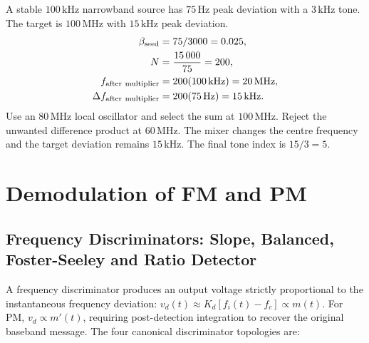 \documentclass[12pt,a4paper]{article}
\begin{document}
\begin{tcolorbox}[examplebox, title={Plan an Armstrong FM Channel}]
A stable $100\,\mathrm{kHz}$ narrowband source has $75\,\mathrm{Hz}$ peak deviation with a $3\,\mathrm{kHz}$ tone. The target is $100\,\mathrm{MHz}$ with $15\,\mathrm{kHz}$ peak deviation.
\[
\begin{aligned}
 \beta_{\rm seed} &= 75/3000=0.025,\\
 N &= \frac{15\,000}{75}=200,\\
 f_{\rm after\ multiplier}&=200(100\,\mathrm{kHz})=20\,\mathrm{MHz},\\
 \Delta f_{\rm after\ multiplier}&=200(75\,\mathrm{Hz})=15\,\mathrm{kHz}.
\end{aligned}
\]
Use an $80\,\mathrm{MHz}$ local oscillator and select the sum at $100\,\mathrm{MHz}$. Reject the unwanted difference product at $60\,\mathrm{MHz}$. The mixer changes the centre frequency and the target deviation remains $15\,\mathrm{kHz}$. The final tone index is $15/3=5$.
\end{tcolorbox}

\pagebreak[3]
\section{Demodulation of FM and PM}
\subsection{Frequency Discriminators: Slope, Balanced, Foster-Seeley and Ratio Detector}
A frequency discriminator produces an output voltage strictly proportional to the instantaneous frequency deviation: $v_d(t) \approx K_d[f_i(t)-f_c] \propto m(t)$. For PM, $v_d \propto m'(t)$, requiring post-detection integration to recover the original baseband message. The four canonical discriminator topologies are:
\end{document}
